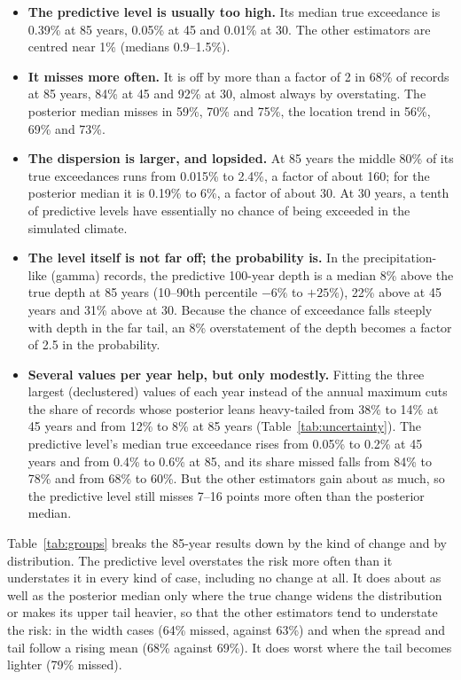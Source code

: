 \documentclass[11pt]{article}
\begin{document}
\begin{itemize}
\item \textbf{The predictive level is usually too high.} Its median true exceedance is 0.39\% at 85
  years, 0.05\% at 45 and 0.01\% at 30. The other estimators are centred near 1\% (medians 0.9--1.5\%).
\item \textbf{It misses more often.} It is off by more than a factor of 2 in 68\% of records at
  85 years, 84\% at 45 and 92\% at 30, almost always by overstating. The posterior median misses in
  59\%, 70\% and 75\%, the location trend in 56\%, 69\% and 73\%.
\item \textbf{The dispersion is larger, and lopsided.} At 85 years the middle 80\% of its true
  exceedances runs from 0.015\% to 2.4\%, a factor of about 160; for the posterior median it is 0.19\%
  to 6\%, a factor of about 30. At 30 years, a tenth of predictive levels have essentially no chance of
  being exceeded in the simulated climate.
\item \textbf{The level itself is not far off; the probability is.} In the precipitation-like
  (gamma) records, the predictive 100-year depth is a median 8\% above the true depth at 85 years
  (10--90th percentile $-6\%$ to $+25\%$), 22\% above at 45 years and 31\% above at 30. Because the
  chance of exceedance falls steeply with depth in the far tail, an 8\% overstatement of the depth
  becomes a factor of 2.5 in the probability.
\item \textbf{Several values per year help, but only modestly.} Fitting the three largest
  (declustered) values of each year instead of the annual maximum cuts the share of records whose
  posterior leans heavy-tailed from 38\% to 14\% at 45 years and from 12\% to 8\% at 85 years
  (Table~\ref{tab:uncertainty}). The predictive level's median true exceedance rises from 0.05\% to
  0.2\% at 45 years and from 0.4\% to 0.6\% at 85, and its share missed falls from 84\% to 78\% and
  from 68\% to 60\%. But the other estimators gain about as much, so the predictive level still
  misses 7--16 points more often than the posterior median.
\end{itemize}

Table~\ref{tab:groups} breaks the 85-year results down by the kind of change and by distribution.
The predictive level overstates the risk more often than it understates it in every kind of case, including no
change at all. It does about as well as the posterior median only where the true change widens the
distribution or makes its upper tail heavier, so that the other estimators tend to understate the
risk: in the width cases (64\% missed, against 63\%) and when the spread and tail follow a rising
mean (68\% against 69\%). It does worst where the tail becomes lighter (79\% missed).
\end{document}
